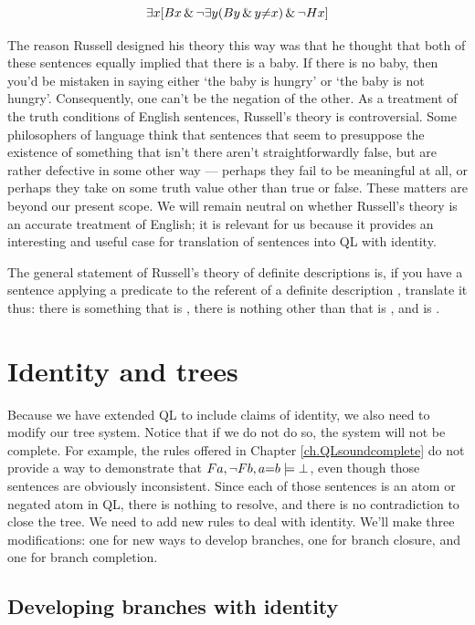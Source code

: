 \begin{equation*}
\exists x [Bx \,\&\, \neg \exists y (By \,\&\, y {\neq} x) \,\&\, \neg Hx]
\end{equation*}

The reason Russell designed his theory this way was that he thought that both of these sentences equally implied that there is a baby. If there is no baby, then you'd be mistaken in saying either `the baby is hungry' or `the baby is not hungry'. Consequently, one can't be the negation of the other. As a treatment of the truth conditions of English sentences, Russell's theory is controversial. Some philosophers of language think that sentences that seem to presuppose the existence of something that isn't there aren't straightforwardly false, but are rather defective in some other way --- perhaps they fail to be meaningful at all, or perhaps they take on some truth value other than true or false. These matters are beyond our present scope. We will remain neutral on whether Russell's theory is an accurate treatment of English; it is relevant for us because it provides an interesting and useful case for translation of sentences into QL with identity.

The general statement of Russell's theory of definite descriptions is, if you have a sentence applying a predicate  to the referent of a definite description , translate it thus: there is something  that is , there is nothing other than  that is , and  is .


\section{Identity and trees}
\label{sec.identity.trees}

Because we have extended QL to include claims of identity, we also need to modify our tree system. Notice that if we do not do so, the system will not be complete. For example, the rules offered in Chapter \ref{ch.QLsoundcomplete} do not provide a way to demonstrate that $Fa, \neg Fb, a{=}b \models \bot$, even though those sentences are obviously inconsistent. Since each of those sentences is an atom or negated atom in QL, there is nothing to resolve, and there is no contradiction to close the tree. We need to add new rules to deal with identity. We'll make three modifications: one for new ways to develop branches, one for branch closure, and one for branch completion.

\subsection{Developing branches with identity}
\label{subsec.identity.develop}

